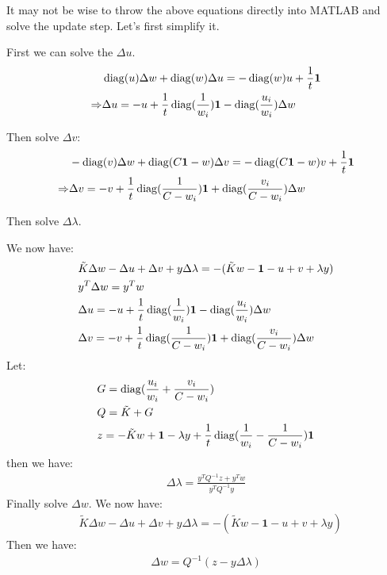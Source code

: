 \documentclass{article}
\theoremstyle{remark}
\theoremstyle{definition}
\newcommand{\diag}{\mathop{\rm diag}}
\begin{document}
\begin{enumerate}[(a)]
\begin{enumerate}[(i)]
      {
      \color{blue}
      It may not be wise to throw the above equations directly into MATLAB and solve the update step. Let's first simplify it.
      
      First we can solve the $\Delta u$.
      \begin{align*}
          &\diag (u) \Delta w + \diag (w) \Delta u = -\diag(w)u+\frac{1}{t}\mathbf{1} \\
          \Rightarrow &\Delta u = -u+\frac{1}{t}\diag(\frac{1}{w_i})\mathbf{1} -\diag(\frac{u_i}{w_i})\Delta w
      \end{align*}
      
      Then solve $\Delta v$:
      \begin{align*}
      &-\diag(v)\Delta w + \diag(C\mathbf{1}-w)\Delta v = -\diag(C\mathbf{1}-w)v + \frac{1}{t}\mathbf{1} \\
      \Rightarrow & \Delta v = -v+\frac{1}{t}\diag(\frac{1}{C-w_i})\mathbf{1}+\diag (\frac{v_i}{C-w_i})\Delta w
      \end{align*}
      
      Then solve $\Delta \lambda$.
      
      We now have:
      \begin{align*}
          &\tilde{K} \Delta w - \Delta u + \Delta v + y\Delta \lambda = -(\tilde{K}w - \mathbf{1} - u + v + \lambda y) \\
          &y^T\Delta w=y^T w \\
          &\Delta u = -u+\frac{1}{t}\diag(\frac{1}{w_i})\mathbf{1} -\diag(\frac{u_i}{w_i})\Delta w \\
          &\Delta v = -v+\frac{1}{t}\diag(\frac{1}{C-w_i})\mathbf{1}+\diag (\frac{v_i}{C-w_i})\Delta w
      \end{align*}
      Let:
      \begin{align*}
          &G=\diag(\frac{u_i}{w_i}+\frac{v_i}{C-w_i}) \\
          &Q = \tilde{K}+G \\
          &z = -\tilde{K}w + \mathbf{1}-\lambda y + \frac{1}{t}\diag(\frac{1}{w_i}-\frac{1}{C-w_i})\mathbf{1}
      \end{align*}
      then we have:
      \begin{align*}
          \Delta \lambda = \frac{y^TQ^{-1}z + y^T w}{y^T Q^{-1} y}
      \end{align*}
      Finally solve $\Delta w$.
      We now have:
      \begin{align*}
          &\tilde{K} \Delta w - \Delta u + \Delta v + y\Delta \lambda = -(\tilde{K}w - \mathbf{1} - u + v + \lambda y)
      \end{align*}
      Then we have:
      \begin{align*}
          \Delta w = Q^{-1}(z-y\Delta \lambda)
      \end{align*}
      
}
\end{enumerate}
\end{enumerate}
\end{document}
